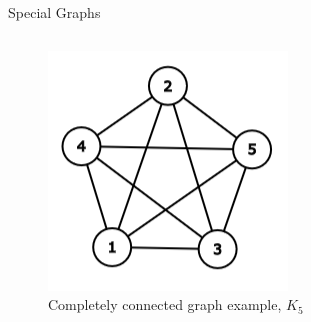 \documentclass[aspectratio=169]{beamer}%
\begin{document}
\begin{frame}{Special Graphs}
\begin{columns}[T]
\begin{column}{.30\textwidth}
            \begin{figure}%
                \centering%
                \includegraphics[width=.9\linewidth]{graph5.png}%
                \caption{Completely connected graph example, $K_5$}%
            \end{figure}%
        \end{column}%
    \end{columns}%
\end{frame}
\end{document}
